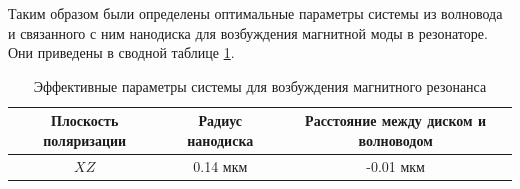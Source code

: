 Таким образом были определены оптимальные параметры системы из волновода и связанного с ним нанодиска для возбуждения магнитной моды в резонаторе. Они приведены в сводной таблице \ref{tbl:effective_params}.

\begin{table}[H]
	\centering
	\begin{tabular}{|c|c|c|}
		\hline
		Плоскость поляризации & Радиус нанодиска & Расстояние между диском и волноводом \\
		\hline
		$XZ$ & 0.14 мкм & -0.01 мкм \\
		\hline
	\end{tabular}
	\caption{Эффективные параметры системы для возбуждения магнитного резонанса}
	\label{tbl:effective_params}
\end{table}
